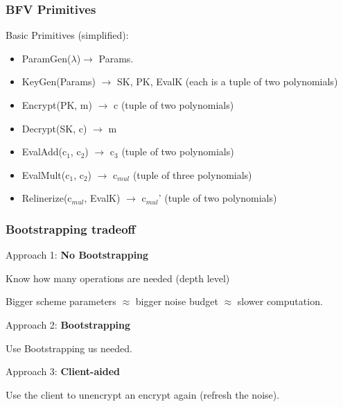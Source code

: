 \documentclass[10pt,handout]{beamer}
\begin{document}

\begin{frame}
\frametitle{BFV Primitives}

    Basic Primitives (simplified):
\begin{itemize}
    \item ParamGen($\lambda$)$\rightarrow$ Params.
    \item KeyGen(Params) $\rightarrow$ SK, PK, EvalK (each is a tuple of two polynomials)
   \item Encrypt(PK, m) $\rightarrow$ c (tuple of two polynomials)
    \item Decrypt(SK, c) $\rightarrow$ m
    \item EvalAdd(c$_1$, c$_2$) $\rightarrow$ c$_3$ (tuple of two polynomials)
    \item EvalMult(c$_1$, c$_2$) $\rightarrow$ c$_{mul}$ (tuple of three polynomials)
    \item Relinerize(c$_{mul}$, EvalK) $\rightarrow$ c$_{mul}$' (tuple of two polynomials)
\end{itemize}

\end{frame}


\begin{frame}
    \frametitle{Bootstrapping tradeoff}

    Approach 1: \textbf{No Bootstrapping}

    Know how many operations are needed (depth level)

    Bigger scheme parameters $\approx$ bigger noise budget $\approx$ slower computation.

    Approach 2: \textbf{Bootstrapping}

    Use Bootstrapping us needed.

    Approach 3: \textbf{Client-aided}

    Use the client to unencrypt an encrypt again (refresh the noise).
\end{frame}



\end{document}
